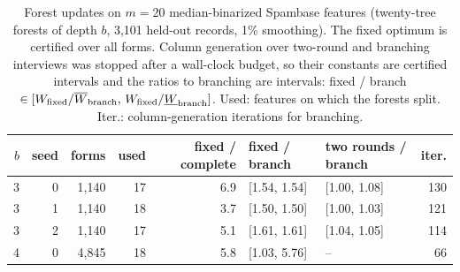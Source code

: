\begin{table}[h]
\centering
\caption{Forest updates on $m=20$ median-binarized Spambase features (twenty-tree forests of depth $b$, 3,101 held-out records, 1\% smoothing). The fixed optimum is certified over all forms. Column generation over two-round and branching interviews was stopped after a wall-clock budget, so their constants are certified intervals and the ratios to branching are intervals: fixed / branch $\in[W_{\rm fixed}/\overline W_{\rm branch},\,W_{\rm fixed}/\underline W_{\rm branch}]$. Used: features on which the forests split. Iter.: column-generation iterations for branching.}
\label{tab:forestscale}
\small
\setlength{\tabcolsep}{4pt}
\begin{tabular}{rrrrrllr}
\toprule
$b$ & seed & forms & used & fixed / complete & fixed / branch & two rounds / branch & iter. \\
\midrule
3 & 0 & 1,140 & 17 & 6.9 & [1.54, 1.54] & [1.00, 1.08] & 130 \\
3 & 1 & 1,140 & 18 & 3.7 & [1.50, 1.50] & [1.00, 1.03] & 121 \\
3 & 2 & 1,140 & 17 & 5.1 & [1.61, 1.61] & [1.04, 1.05] & 114 \\
4 & 0 & 4,845 & 18 & 5.8 & [1.03, 5.76] & -- & 66 \\
\bottomrule
\end{tabular}
\end{table}
